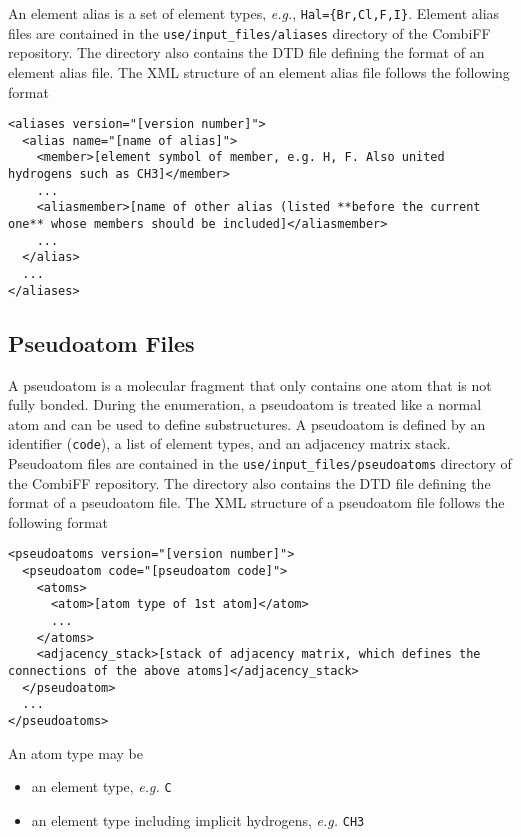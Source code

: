 \documentclass[a4paper,11pt]{article}
\begin{document}
An element alias is a set of element types, \textit{e.g.}, \texttt{Hal=\{Br,Cl,F,I\}}.\cite{Rieder2022} Element alias files are contained in the \texttt{use/input\_files/aliases} directory of the CombiFF repository. The directory also contains the DTD file defining the format of an element alias file. The XML structure of an element alias file follows the following format

\begin{lstlisting}
<aliases version="[version number]">
  <alias name="[name of alias]">
    <member>[element symbol of member, e.g. H, F. Also united hydrogens such as CH3]</member>
    ...
    <aliasmember>[name of other alias (listed **before the current one** whose members should be included]</aliasmember>
    ...
  </alias>
  ...
</aliases>
\end{lstlisting}

\subsection{Pseudoatom Files}\label{sec:pseudoatoms}

A pseudoatom is a molecular fragment that only contains one atom that is not fully bonded.\cite{Rieder2022} During the enumeration, a pseudoatom is treated like a normal atom and can be used to define substructures. A pseudoatom is defined by an identifier (\texttt{code}), a list of element types, and an adjacency matrix stack. Pseudoatom files are contained in the \texttt{use/input\_files/pseudoatoms} directory of the CombiFF repository. The directory also contains the DTD file defining the format of a pseudoatom file. The XML structure of a pseudoatom file follows the following format

\begin{lstlisting}
<pseudoatoms version="[version number]">
  <pseudoatom code="[pseudoatom code]">
    <atoms>
      <atom>[atom type of 1st atom]</atom>
      ...
    </atoms>
    <adjacency_stack>[stack of adjacency matrix, which defines the connections of the above atoms]</adjacency_stack>
  </pseudoatom>
  ...
</pseudoatoms>
\end{lstlisting}

An atom type may be

\begin{itemize}
  \item an element type, \textit{e.g.} \texttt{C}
  \item an element type including implicit hydrogens, \textit{e.g.} \texttt{CH3}
\end{itemize}
\end{document}
